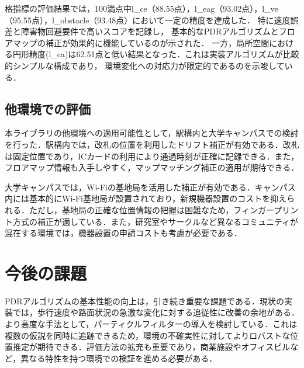 \documentclass[a4paper, 10pt, twocolumn]{jarticle}
\begin{document}
格指標の評価結果では，100満点中l\_ce（88.55点），l\_eag（93.02点），l\_ve（95.55点），l\_obstacle（93.48点）において一定の精度を達成した．
特に速度誤差と障害物回避要件で高いスコアを記録し，
基本的なPDRアルゴリズムとフロアマップの補正が効果的に機能しているのが示された．
一方，局所空間における円形精度(l\_ca)は62.51点と低い結果となった．これは実装アルゴリズムが比較的シンプルな構成であり，
環境変化への対応力が限定的であるのを示唆している．



\subsection{他環境での評価}
本ライブラリの他環境への適用可能性として，駅構内と大学キャンパスでの検討を行った．駅構内では，改札の位置を利用したドリフト補正が有効である．改札は固定位置であり，ICカードの利用により通過時刻が正確に記録できる．また，フロアマップ情報も入手しやすく，マップマッチング補正の適用が期待できる．

大学キャンパスでは，Wi-Fiの基地局を活用した補正が有効である．キャンパス内には基本的にWi-Fi基地局が設置されており，新規機器設置のコストを抑えられる．ただし，基地局の正確な位置情報の把握は困難なため，フィンガープリント方式の補正が適している．また，研究室やサークルなど異なるコミュニティが混在する環境では，機器設置の申請コストも考慮が必要である．



\section{今後の課題}
PDRアルゴリズムの基本性能の向上は，引き続き重要な課題である．現状の実装では，歩行速度や路面状況の急激な変化に対する追従性に改善の余地がある．より高度な手法として，パーティクルフィルターの導入を検討している．これは複数の仮説を同時に追跡できるため，環境の不確実性に対してよりロバストな位置推定が期待できる．評価方法の拡充も重要であり，商業施設やオフィスビルなど，異なる特性を持つ環境での検証を進める必要がある．




\end{document}
